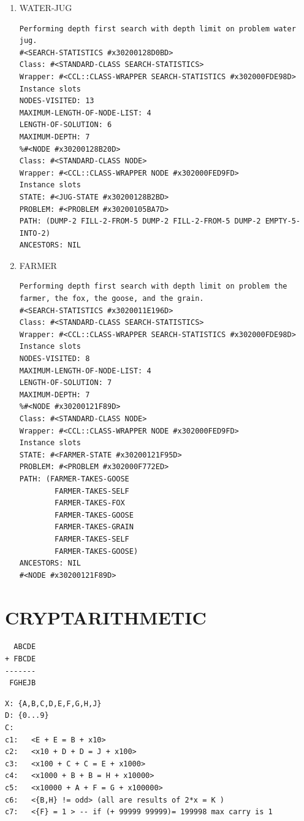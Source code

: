 \documentclass[a4paper,8pt]{article}
\begin{document}
\begin{enumerate}
\item WATER-JUG
\label{sec-1-2-3-1}
\begin{verbatim}
Performing depth first search with depth limit on problem water jug.
#<SEARCH-STATISTICS #x30200128D0BD>
Class: #<STANDARD-CLASS SEARCH-STATISTICS>
Wrapper: #<CCL::CLASS-WRAPPER SEARCH-STATISTICS #x302000FDE98D>
Instance slots
NODES-VISITED: 13
MAXIMUM-LENGTH-OF-NODE-LIST: 4
LENGTH-OF-SOLUTION: 6
MAXIMUM-DEPTH: 7
%#<NODE #x30200128B20D>
Class: #<STANDARD-CLASS NODE>
Wrapper: #<CCL::CLASS-WRAPPER NODE #x302000FED9FD>
Instance slots
STATE: #<JUG-STATE #x30200128B2BD>
PROBLEM: #<PROBLEM #x30200105BA7D>
PATH: (DUMP-2 FILL-2-FROM-5 DUMP-2 FILL-2-FROM-5 DUMP-2 EMPTY-5-INTO-2)
ANCESTORS: NIL
\end{verbatim}

\item FARMER
\label{sec-1-2-3-2}
\begin{verbatim}
Performing depth first search with depth limit on problem the farmer, the fox, the goose, and the grain.
#<SEARCH-STATISTICS #x3020011E196D>
Class: #<STANDARD-CLASS SEARCH-STATISTICS>
Wrapper: #<CCL::CLASS-WRAPPER SEARCH-STATISTICS #x302000FDE98D>
Instance slots
NODES-VISITED: 8
MAXIMUM-LENGTH-OF-NODE-LIST: 4
LENGTH-OF-SOLUTION: 7
MAXIMUM-DEPTH: 7
%#<NODE #x30200121F89D>
Class: #<STANDARD-CLASS NODE>
Wrapper: #<CCL::CLASS-WRAPPER NODE #x302000FED9FD>
Instance slots
STATE: #<FARMER-STATE #x30200121F95D>
PROBLEM: #<PROBLEM #x302000F772ED>
PATH: (FARMER-TAKES-GOOSE
        FARMER-TAKES-SELF
        FARMER-TAKES-FOX
        FARMER-TAKES-GOOSE
        FARMER-TAKES-GRAIN
        FARMER-TAKES-SELF
        FARMER-TAKES-GOOSE)
ANCESTORS: NIL
#<NODE #x30200121F89D>
\end{verbatim}
\end{enumerate}
\section{CRYPTARITHMETIC}
\label{sec-2}
\begin{verbatim}
  ABCDE
+ FBCDE
-------
 FGHEJB
\end{verbatim}
\begin{verbatim}
X: {A,B,C,D,E,F,G,H,J}
D: {0...9}
C: 
c1:   <E + E = B + x10>
c2:   <x10 + D + D = J + x100>
c3:   <x100 + C + C = E + x1000>
c4:   <x1000 + B + B = H + x10000>
c5:   <x10000 + A + F = G + x100000>
c6:   <{B,H} != odd> (all are results of 2*x = K )
c7:   <{F} = 1 > -- if (+ 99999 99999)= 199998 max carry is 1
\end{verbatim}
\end{document}
